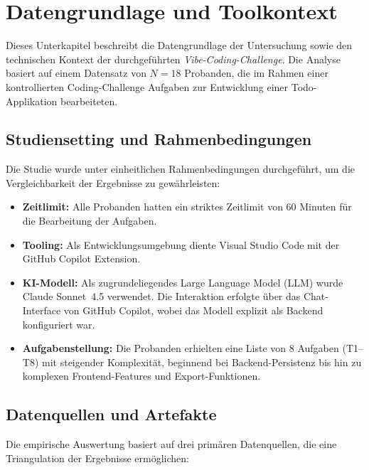 \section{Datengrundlage und Toolkontext}
\label{sec:results_context}

Dieses Unterkapitel beschreibt die Datengrundlage der Untersuchung sowie den technischen Kontext der durchgeführten  \textit{Vibe-Coding-Challenge}. Die Analyse basiert auf einem Datensatz von $N=18$ Probanden, die im Rahmen einer kontrollierten Coding-Challenge Aufgaben zur Entwicklung einer Todo-Applikation bearbeiteten.

\subsection{Studiensetting und Rahmenbedingungen}
Die Studie wurde unter einheitlichen Rahmenbedingungen durchgeführt, um die Vergleichbarkeit der Ergebnisse zu gewährleisten:
\begin{itemize}
    \item  \textbf{Zeitlimit:} Alle Probanden hatten ein striktes Zeitlimit von 60 Minuten für die Bearbeitung der Aufgaben.
    \item  \textbf{Tooling:} Als Entwicklungsumgebung diente Visual Studio Code mit der GitHub Copilot Extension.
    \item  \textbf{KI-Modell:} Als zugrundeliegendes Large Language Model (LLM) wurde Claude Sonnet~4.5 verwendet. Die Interaktion erfolgte über das Chat-Interface von GitHub Copilot, wobei das Modell explizit als Backend konfiguriert war.
    \item  \textbf{Aufgabenstellung:} Die Probanden erhielten eine Liste von 8 Aufgaben (T1--T8) mit steigender Komplexität, beginnend bei Backend-Persistenz bis hin zu komplexen Frontend-Features und Export-Funktionen.
\end{itemize}

\subsection{Datenquellen und Artefakte}
Die empirische Auswertung basiert auf drei primären Datenquellen, die eine Triangulation der Ergebnisse ermöglichen:

